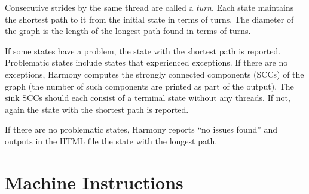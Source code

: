 \documentclass{report}
\begin{document}
Consecutive strides by the same thread are called a \emph{turn}.
Each state maintains the shortest path to it from the initial state in terms
of turns.
The diameter of the graph is the length of the longest path found in
terms of turns.

If some states have a problem, the state with the shortest path is reported.
Problematic states include states that experienced exceptions.
If there are no exceptions, Harmony computes the strongly connected components (SCCs)
of the graph (the number of such components are printed as part of the output).
The sink SCCs should each consist of a terminal state without any threads.
If not, again the state with the shortest path is reported.

If there are no problematic states, Harmony reports ``no issues found'' and outputs
in the HTML file the state with the longest path.

\section{Machine Instructions}
\label{ap:harmonybytecode}
\end{document}
